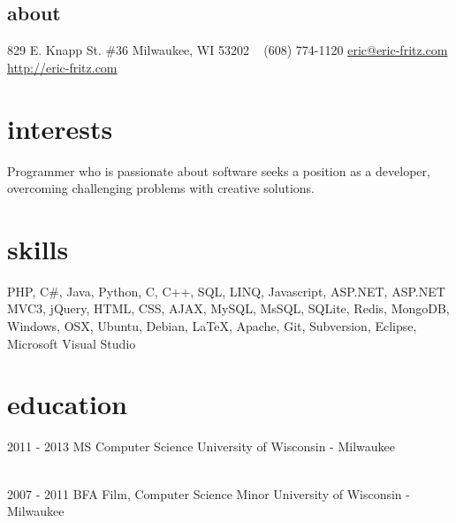 \documentclass[]{fritz-resume}
\begin{document}


\begin{aside}
  \section{about}
    829 E. Knapp St. \#36
    Milwaukee, WI 53202
    ~
    (608) 774-1120
    \href{mailto:eric@eric-fritz.com?subject=Resume}{eric@eric-fritz.com}
    \href{http://eric-fritz.com}{http://eric-fritz.com}
\end{aside}


\section{interests}

{\small Programmer who is passionate about software seeks a position as a developer, overcoming challenging problems with creative solutions.}


\section{skills}

{\small PHP, C\#, Java, Python, C, C++, SQL, LINQ, Javascript, ASP.NET, ASP.NET MVC3, jQuery, HTML, CSS, AJAX, MySQL, MsSQL, SQLite, Redis, MongoDB, Windows, OSX, Ubuntu, Debian, \LaTeX{}, Apache, Git, Subversion, Eclipse, Microsoft Visual Studio}


\section{education}

\begin{entrylist}
  \entry
    {2011 - 2013}
    {MS Computer Science}
    {University of Wisconsin - Milwaukee}
    {
       \\
       \\
    }

  \entry
    {2007 - 2011}
    {BFA Film, Computer Science Minor}
    {University of Wisconsin - Milwaukee}
    {
       \\
    }
\end{entrylist}
\end{document}
